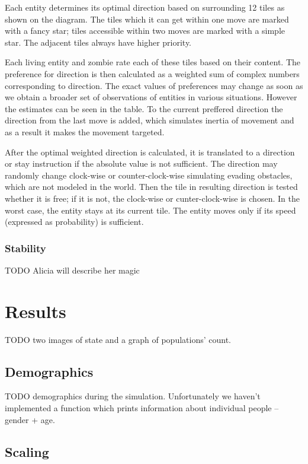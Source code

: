 \documentclass[a4paper]{article}
\begin{document}
Each entity determines its optimal direction based on surrounding 12 tiles as shown on the diagram.
The tiles which it can get within one move are marked with a fancy star; tiles accessible within two moves are marked with a simple star.
The adjacent tiles always have higher priority.

Each living entity and zombie rate each of these tiles based on their content.
The preference for direction is then calculated as a weighted sum of complex numbers corresponding to direction.
The exact values of preferences may change as soon as we obtain a broader set of observations of entities in various situations.
However the estimates can be seen in the table.
To the current preffered direction the direction from the last move is added, which simulates inertia of movement and as a result it makes the movement targeted.

After the optimal weighted direction is calculated, it is translated to a direction or stay instruction if the absolute value is not sufficient.
The direction may randomly change clock-wise or counter-clock-wise simulating evading obstacles, which are not modeled in the world.
Then the tile in resulting direction is tested whether it is free; if it is not, the clock-wise or cunter-clock-wise is chosen.
In the worst case, the entity stays at its current tile.
The entity moves only if its speed (expressed as probability) is sufficient.

\subsubsection{Stability}

TODO Alicia will describe her magic

\section{Results}

TODO two images of state and a graph of populations' count.

\subsection{Demographics}

TODO demographics during the simulation.
Unfortunately we haven't implemented a function which prints information about individual people -- gender + age.

\subsection{Scaling}
\end{document}
